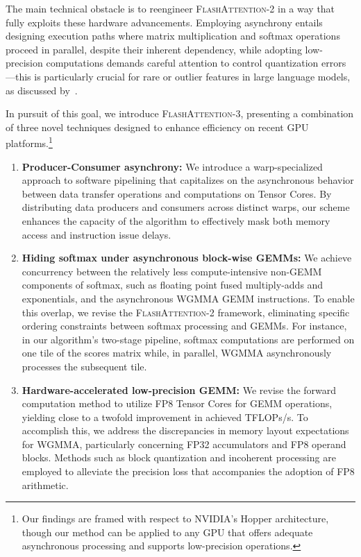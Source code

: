 The main technical obstacle is to reengineer \textsc{FlashAttention-2} in a way that fully exploits these hardware advancements. Employing asynchrony entails designing execution paths where matrix multiplication and softmax operations proceed in parallel, despite their inherent dependency, while adopting low-precision computations demands careful attention to control quantization errors—this is particularly crucial for rare or outlier features in large language models, as discussed by~\citet{dettmers2208llm, sun2024massive}.

In pursuit of this goal, we introduce \textsc{FlashAttention-3}, presenting a combination of three novel techniques designed to enhance efficiency on recent GPU platforms.\footnote{Our findings are framed with respect to NVIDIA's Hopper architecture, though our method can be applied to any GPU that offers adequate asynchronous processing and supports low-precision operations.}

\begin{enumerate}

\item \textbf{Producer-Consumer asynchrony:} We introduce a warp-specialized approach to software pipelining that capitalizes on the asynchronous behavior between data transfer operations and computations on Tensor Cores. By distributing data producers and consumers across distinct warps, our scheme enhances the capacity of the algorithm to effectively mask both memory access and instruction issue delays.

\item \textbf{Hiding softmax under asynchronous block-wise GEMMs:} We achieve concurrency between the relatively less compute-intensive non-GEMM components of softmax, such as floating point fused multiply-adds and exponentials, and the asynchronous WGMMA GEMM instructions. To enable this overlap, we revise the \textsc{FlashAttention-2} framework, eliminating specific ordering constraints between softmax processing and GEMMs. For instance, in our algorithm’s two-stage pipeline, softmax computations are performed on one tile of the scores matrix while, in parallel, WGMMA asynchronously processes the subsequent tile.

\item \textbf{Hardware-accelerated low-precision GEMM:} We revise the forward computation method to utilize FP8 Tensor Cores for GEMM operations, yielding close to a twofold improvement in achieved TFLOPs/s. To accomplish this, we address the discrepancies in memory layout expectations for WGMMA, particularly concerning FP32 accumulators and FP8 operand blocks. Methods such as block quantization and incoherent processing are employed to alleviate the precision loss that accompanies the adoption of FP8 arithmetic.
\end{enumerate}

